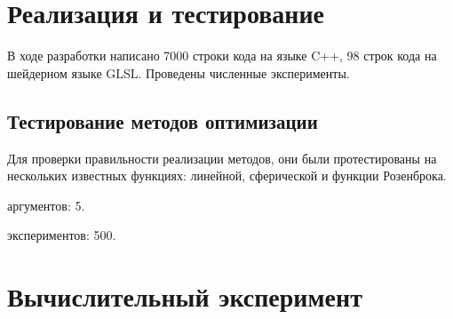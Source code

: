 \chapter{Реализация и тестирование}
\noindent\indent В ходе разработки написано 7000 строки кода на языке C++,
98 строк кода на шейдерном языке GLSL. Проведены численные эксперименты.
\section{Тестирование методов оптимизации}
\noindent Для проверки правильности реализации методов, они были протестированы на
нескольких известных функциях: линейной, сферической и функции Розенброка.\par
{} аргументов: 5.\par
{} экспериментов: 500.\par
\begin{table}[ht]
\centering
{}
\caption{Результаты тестирования алгоритмов оптимизации}
\end{table}\par
\chapter{Вычислительный эксперимент}
